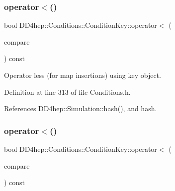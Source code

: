 \hypertarget{class_d_d4hep_1_1_conditions_1_1_condition_key_a86b3b301db1016d6e2ce16df3b79d924}{}\label{class_d_d4hep_1_1_conditions_1_1_condition_key_a86b3b301db1016d6e2ce16df3b79d924} 
\subsubsection{\texorpdfstring{operator$<$()}{operator<()}\hspace{0.1cm}{\footnotesize\ttfamily [1/3]}}
{\footnotesize\ttfamily bool D\+D4hep\+::\+Conditions\+::\+Condition\+Key\+::operator$<$ (\begin{DoxyParamCaption}\item[{const \hyperlink{class_d_d4hep_1_1_conditions_1_1_condition_key}{Condition\+Key} \&}]{compare }\end{DoxyParamCaption}) const\hspace{0.3cm}{\ttfamily [inline]}}



Operator less (for map insertions) using key object. 



Definition at line 313 of file Conditions.\+h.



References D\+D4hep\+::\+Simulation\+::hash(), and hash.

\hypertarget{class_d_d4hep_1_1_conditions_1_1_condition_key_a6d10b8fecbe77dd306aac3aa7990d194}{}\label{class_d_d4hep_1_1_conditions_1_1_condition_key_a6d10b8fecbe77dd306aac3aa7990d194} 
\subsubsection{\texorpdfstring{operator$<$()}{operator<()}\hspace{0.1cm}{\footnotesize\ttfamily [2/3]}}
{\footnotesize\ttfamily bool D\+D4hep\+::\+Conditions\+::\+Condition\+Key\+::operator$<$ (\begin{DoxyParamCaption}\item[{const \hyperlink{class_d_d4hep_1_1_conditions_1_1_condition_key_a08bfc8ccb807bdd5e4d9f3b065d1c8f5}{key\+\_\+type}}]{compare }\end{DoxyParamCaption}) const\hspace{0.3cm}{\ttfamily [inline]}}



